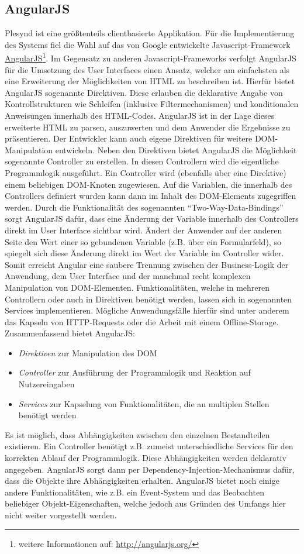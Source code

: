 \subsection{AngularJS}\label{section:angularjs}
Plesynd ist eine größtenteils clientbasierte Applikation. Für die Implementierung des Systems fiel die Wahl auf das von Google entwickelte Javascript-Framework \href{http://angularjs.org/}{AngularJS}\footnote{weitere Informationen auf: \url{http://angularjs.org/}}. Im Gegensatz zu anderen Javascript-Frameworks verfolgt AngularJS für die Umsetzung des User Interfaces einen Ansatz, welcher am einfachsten als eine Erweiterung der Möglichkeiten von HTML zu beschreiben ist. Hierfür bietet AngularJS sogenannte Direktiven. Diese erlauben die deklarative Angabe von Kontrollstrukturen wie Schleifen (inklusive Filtermechanismen) und konditionalen Anweisungen innerhalb des HTML-Codes. AngularJS ist in der Lage dieses erweiterte HTML zu parsen, auszuwerten und dem Anwender die Ergebnisse zu präsentieren. Der Entwickler kann auch eigene Direktiven für weitere DOM-Manipulation entwickeln. Neben den Direktiven bietet AngularJS die Möglichkeit sogenannte Controller zu erstellen. In diesen Controllern wird die eigentliche Programmlogik ausgeführt. Ein Controller wird (ebenfalls über eine Direktive) einem beliebigen DOM-Knoten zugewiesen. Auf die Variablen, die innerhalb des Controllers definiert wurden kann dann im Inhalt des DOM-Elements zugegriffen werden. Durch die Funktionalität des sogenannten "`Two-Way-Data-Bindings"' sorgt AngularJS dafür, dass eine Änderung der Variable innerhalb des Controllers direkt im User Interface sichtbar wird. Ändert der Anwender auf der anderen Seite den Wert einer so gebundenen Variable (z.B. über ein Formularfeld), so spiegelt sich diese Änderung direkt im Wert der Variable im Controller wider. Somit erreicht Angular eine saubere Trennung zwischen der Business-Logik der Anwendung, dem User Interface und der manchmal recht komplexen Manipulation von DOM-Elementen. Funktionalitäten, welche in mehreren Controllern oder auch in Direktiven benötigt werden, lassen sich in sogenannten Services implementieren. Mögliche Anwendungsfälle hierfür sind unter anderem das Kapseln von HTTP-Requests oder die Arbeit mit einem Offline-Storage. Zusammenfassend bietet AngularJS:
\begin{itemize}
 \item \emph{Direktiven} zur Manipulation des DOM
 \item \emph{Controller} zur Ausführung der Programmlogik und Reaktion auf Nutzereingaben
 \item \emph{Services} zur Kapselung von Funktionalitäten, die an multiplen Stellen benötigt werden
\end{itemize}
Es ist möglich, dass Abhängigkeiten zwischen den einzelnen Bestandteilen existieren. Ein Controller benötigt z.B. zumeist unterschiedliche Services für den korrekten Ablauf der Programmlogik. Diese Abhängigkeiten werden deklarativ angegeben. AngularJS sorgt dann per Dependency-Injection-Mechanismus dafür, dass die Objekte ihre Abhängigkeiten erhalten. AngularJS bietet noch einige andere Funktionalitäten, wie z.B. ein Event-System und das Beobachten beliebiger Objekt-Eigenschaften, welche jedoch aus Gründen des Umfangs hier nicht weiter vorgestellt werden.

